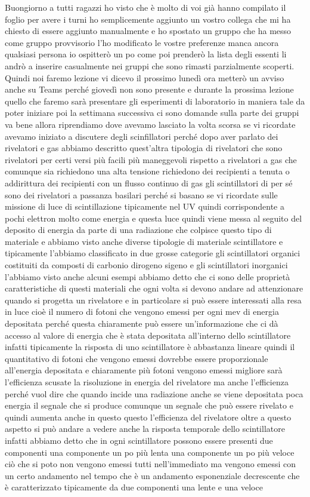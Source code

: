 Buongiorno a tutti ragazzi ho visto che è molto di voi già hanno compilato il foglio per avere i turni ho semplicemente aggiunto un vostro collega che mi ha chiesto di essere aggiunto manualmente e ho spostato un gruppo che ha messo come gruppo provvisorio l'ho modificato le vostre preferenze manca ancora qualsiasi persona io ospitterò un po come poi prenderò la lista degli essenti li andrò a inserire casualmente nei gruppi che sono rimasti parzialmente scoperti. Quindi noi faremo lezione vi dicevo il prossimo lunedì ora metterò un avviso anche su Teams perché giovedì non sono presente e durante la prossima lezione quello che faremo sarà presentare gli esperimenti di laboratorio in maniera tale da poter iniziare poi la settimana successiva ci sono domande sulla parte dei gruppi va bene allora riprendiamo dove avevamo lasciato la volta scorsa se vi ricordate avevamo iniziato a discutere degli scinfillatori perché dopo aver parlato dei rivelatori e gas abbiamo descritto quest'altra tipologia di rivelatori che sono rivelatori per certi versi più facili più maneggevoli rispetto a rivelatori a gas che comunque sia richiedono una alta tensione richiedono dei recipienti a tenuta o addirittura dei recipienti con un flusso continuo di gas gli scintillatori di per sé sono dei rivelatori a passanza basilari perché si basano se vi ricordate sulle missione di luce di scintillazione tipicamente nel UV quindi corrispondente a pochi elettron molto come energia e questa luce quindi viene messa al seguito del deposito di energia da parte di una radiazione che colpisce questo tipo di materiale e abbiamo visto anche diverse tipologie di materiale scintillatore e tipicamente l'abbiamo classificato in due grosse categorie gli scintillatori organici costituiti da composti di carbonio dirogeno sigeno e gli scintillatori inorganici l'abbiamo visto anche alcuni esempi abbiamo detto che ci sono delle proprietà caratteristiche di questi materiali che ogni volta si devono andare ad attenzionare quando si progetta un rivelatore e in particolare si può essere interessati alla resa in luce cioè il numero di fotoni che vengono emessi per ogni mev di energia depositata perché questa chiaramente può essere un'informazione che ci dà accesso al valore di energia che è stata depositata all'interno dello scintillatore infatti tipicamente la risposta di uno scintillatore è abbastanza lineare quindi il quantitativo di fotoni che vengono emessi dovrebbe essere proporzionale all'energia depositata e chiaramente più fotoni vengono emessi migliore sarà l'efficienza scusate la risoluzione in energia del rivelatore ma anche l'efficienza perché vuol dire che quando incide una radiazione anche se viene depositata poca energia il segnale che si produce comunque un segnale che può essere rivelato e quindi aumenta anche in questo questo l'efficienza del rivelatore oltre a questo aspetto si può andare a vedere anche la risposta temporale dello scintillatore infatti abbiamo detto che in ogni scintillatore possono essere presenti due componenti una componente un po più lenta una componente un po più veloce ciò che si poto non vengono emessi tutti nell'immediato ma vengono emessi con un certo andamento nel tempo che è un andamento esponenziale decrescente che è caratterizzato tipicamente da due componenti una lente e una veloce 